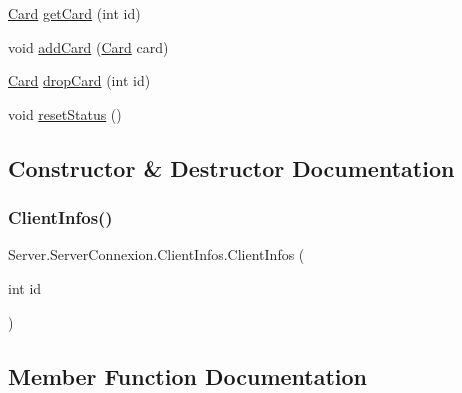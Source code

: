 \begin{DoxyCompactItemize}
\item 
\mbox{\hyperlink{classCommon_1_1Card}{Card}} \mbox{\hyperlink{classServer_1_1ServerConnexion_1_1ClientInfos_a59f88a0546f6dbc1debbf59482144332}{get\+Card}} (int id)
\item 
void \mbox{\hyperlink{classServer_1_1ServerConnexion_1_1ClientInfos_a7c773a28b6464e2ed8e9864bfc5793cb}{add\+Card}} (\mbox{\hyperlink{classCommon_1_1Card}{Card}} card)
\item 
\mbox{\hyperlink{classCommon_1_1Card}{Card}} \mbox{\hyperlink{classServer_1_1ServerConnexion_1_1ClientInfos_af561becca2a435a2190dc945949f524d}{drop\+Card}} (int id)
\item 
void \mbox{\hyperlink{classServer_1_1ServerConnexion_1_1ClientInfos_a7dee6a06e3869026da38c0e7d1b9e2b6}{reset\+Status}} ()
\end{DoxyCompactItemize}


\subsection{Constructor \& Destructor Documentation}
\mbox{\label{classServer_1_1ServerConnexion_1_1ClientInfos_a970d91293292cf6f463e532dc69734cf}} 
\subsubsection{\texorpdfstring{Client\+Infos()}{ClientInfos()}}
{\footnotesize\ttfamily Server.\+Server\+Connexion.\+Client\+Infos.\+Client\+Infos (\begin{DoxyParamCaption}\item[{int}]{id }\end{DoxyParamCaption})\hspace{0.3cm}{\ttfamily [inline]}}



\subsection{Member Function Documentation}
\mbox{\label{classServer_1_1ServerConnexion_1_1ClientInfos_a7c773a28b6464e2ed8e9864bfc5793cb}} 
